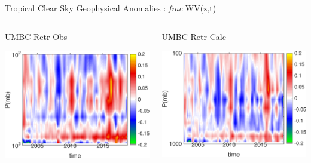 \documentclass[10pt,t]{beamer}
\begin{document}
\begin{frame}{Tropical Clear Sky Geophysical Anomalies : \textit{frac} WV(z,t)}
\begin{columns}
\begin{column}{0.45\columnwidth}
\begin{block}{\footnotesize UMBC Retr Obs}
\vspace{-0.1in}
\begin{center}
\includegraphics[width=\linewidth]{Figs/ClearAnom/umbc_clr_retr_obs_wv_anom_200209_201808.png}
\end{center}
\end{block}
\end{column}

\begin{column}{0.45\columnwidth}
\begin{block}{\footnotesize UMBC Retr Calc}
\vspace{-0.1in}
\begin{center}
\includegraphics[width=\linewidth]{Figs/ClearAnom/umbc_clr_retr_cal_wv_anom_200209_201808.png}
\end{center}
\end{block}
\end{column}
\end{columns}

\end{frame}
\end{document}
